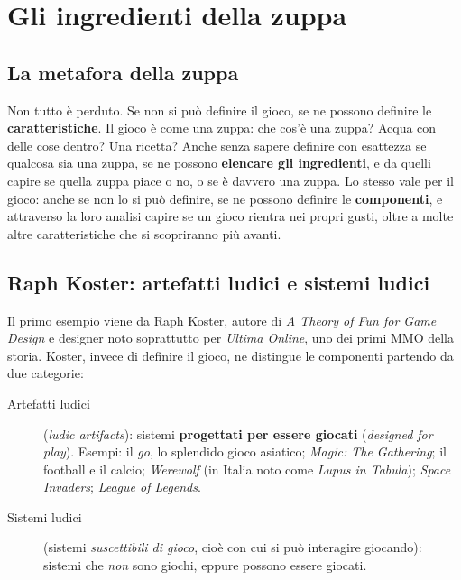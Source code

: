 \section{Gli ingredienti della zuppa}
\label{sec:zuppa}

\subsection{La metafora della zuppa}

Non tutto è perduto. Se non si può definire il gioco, se ne possono definire
le \textbf{caratteristiche}. Il gioco è come una zuppa: che cos'è una zuppa?
Acqua con delle cose dentro? Una ricetta? Anche senza sapere definire con
esattezza se qualcosa sia una zuppa, se ne possono \textbf{elencare gli
ingredienti}, e da quelli capire se quella zuppa piace o no, o se è davvero una
zuppa. Lo stesso vale per il gioco: anche se non lo si può definire, se ne
possono definire le \textbf{componenti}, e attraverso la loro analisi capire
se un gioco rientra nei propri gusti, oltre a molte altre caratteristiche che
si scopriranno più avanti.

\subsection{Raph Koster: artefatti ludici e sistemi ludici}



Il primo esempio viene da Raph Koster, autore di \emph{A Theory of Fun for
Game Design} e designer noto soprattutto per \emph{Ultima Online}, uno dei
primi MMO della storia. Koster, invece di definire il gioco, ne distingue le
componenti partendo da due categorie:

\begin{description}
  \item[Artefatti ludici] (\emph{ludic artifacts}): sistemi \textbf{progettati
        per essere giocati} (\emph{designed for play}). Esempi: il \emph{go}, lo
        splendido gioco asiatico; \emph{Magic: The Gathering}; il football e il
        calcio; \emph{Werewolf} (in Italia noto come \emph{Lupus in
        Tabula}); \emph{Space Invaders}; \emph{League of Legends}.
  \item[Sistemi ludici] (sistemi \emph{suscettibili di gioco}, cioè con cui
        si può interagire giocando): sistemi che \emph{non} sono giochi, eppure
        possono essere giocati.
\end{description}

